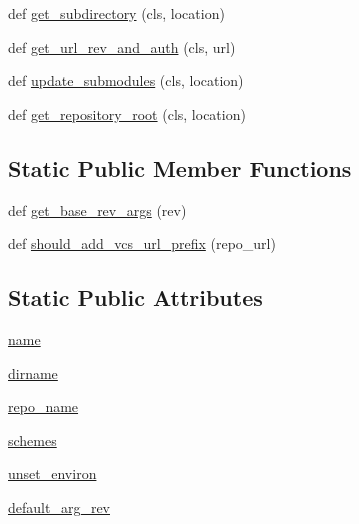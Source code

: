 \begin{DoxyCompactItemize}
\item 
def \hyperlink{classpip_1_1__internal_1_1vcs_1_1git_1_1Git_a495672bb014464b725f5353f04c64b02}{get\+\_\+subdirectory} (cls, location)
\item 
def \hyperlink{classpip_1_1__internal_1_1vcs_1_1git_1_1Git_a6f5f76aa10b8e86ccd3c87826875cf8d}{get\+\_\+url\+\_\+rev\+\_\+and\+\_\+auth} (cls, url)
\item 
def \hyperlink{classpip_1_1__internal_1_1vcs_1_1git_1_1Git_a6cd58ea4608a75bdfb07e06f0137e07f}{update\+\_\+submodules} (cls, location)
\item 
def \hyperlink{classpip_1_1__internal_1_1vcs_1_1git_1_1Git_a4dabca50902c3f705f254a8053a77ffc}{get\+\_\+repository\+\_\+root} (cls, location)
\end{DoxyCompactItemize}
\subsection*{Static Public Member Functions}
\begin{DoxyCompactItemize}
\item 
def \hyperlink{classpip_1_1__internal_1_1vcs_1_1git_1_1Git_aaf507b7ae315290c44a8b59defe868da}{get\+\_\+base\+\_\+rev\+\_\+args} (rev)
\item 
def \hyperlink{classpip_1_1__internal_1_1vcs_1_1git_1_1Git_a8cda8f1d82024ac4a9c878f02b90ccda}{should\+\_\+add\+\_\+vcs\+\_\+url\+\_\+prefix} (repo\+\_\+url)
\end{DoxyCompactItemize}
\subsection*{Static Public Attributes}
\begin{DoxyCompactItemize}
\item 
\hyperlink{classpip_1_1__internal_1_1vcs_1_1git_1_1Git_a69e2d93063874505215fada01ac80b68}{name}
\item 
\hyperlink{classpip_1_1__internal_1_1vcs_1_1git_1_1Git_a08d1f734bf9776d4720358cf4f22d273}{dirname}
\item 
\hyperlink{classpip_1_1__internal_1_1vcs_1_1git_1_1Git_a972701434d43ca0e5f22ad3da402bb4a}{repo\+\_\+name}
\item 
\hyperlink{classpip_1_1__internal_1_1vcs_1_1git_1_1Git_a5a4c8708a69c8e8cdd29e4cd727cccfc}{schemes}
\item 
\hyperlink{classpip_1_1__internal_1_1vcs_1_1git_1_1Git_a0c07a64c520109d3dbb8b0c3322177c6}{unset\+\_\+environ}
\item 
\hyperlink{classpip_1_1__internal_1_1vcs_1_1git_1_1Git_aebd4df79f69f8524dd24926cc0a3086b}{default\+\_\+arg\+\_\+rev}
\end{DoxyCompactItemize}


